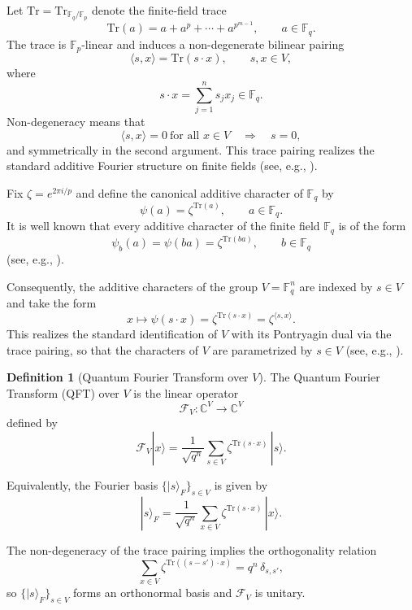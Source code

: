 \documentclass[a4paper,twocolumn,11pt,allowtoday]{quantumarticle}
\theoremstyle{plain}
\theoremstyle{definition}
\newtheorem{definition}[theorem]{Definition}
\theoremstyle{remark}
\begin{document}
Let $\mathrm{Tr}=\mathrm{Tr}_{\mathbb{F}_q/\mathbb{F}_p}$ denote the finite-field trace
\[
\mathrm{Tr}(a)=a+a^p+\cdots+a^{p^{m-1}},
\qquad a\in\mathbb{F}_q.
\]
The trace is $\mathbb{F}_p$-linear and induces a non-degenerate bilinear pairing
\[
\langle s,x\rangle
=
\mathrm{Tr}(s\cdot x),
\qquad s,x\in V,
\]
where
\[
s\cdot x=\sum_{j=1}^n s_j x_j \in \mathbb{F}_q.
\]
Non-degeneracy means that
\[
\langle s,x\rangle=0 \ \text{for all } x\in V
\quad\Longrightarrow\quad
s=0,
\]
and symmetrically in the second argument. 
This trace pairing realizes the standard additive Fourier structure on finite fields (see, e.g., \cite{MacWilliamsSloane}).

Fix $\zeta=e^{2\pi i/p}$ and define the canonical additive character
of $\mathbb{F}_q$ by
\[
\psi(a)=\zeta^{\mathrm{Tr}(a)},
\qquad a\in\mathbb{F}_q .
\]
It is well known that every additive character of the finite field
$\mathbb{F}_q$ is of the form
\[
\psi_b(a)=\psi(ba)=\zeta^{\mathrm{Tr}(ba)},
\qquad b\in\mathbb{F}_q
\]
(see, e.g., \cite{LidlNiederreiter}).

Consequently, the additive characters of the group
$V=\mathbb{F}_q^n$ are indexed by $s\in V$ and take the form
\[
x\longmapsto\psi(s\cdot x)
=
\zeta^{\mathrm{Tr}(s\cdot x)}
=
\zeta^{\langle s,x\rangle}.
\]
This realizes the standard identification of $V$ with its Pontryagin
dual via the trace pairing, so that the characters of $V$ are
parametrized by $s\in V$ (see, e.g., \cite{TaoVu}).


\begin{definition}[Quantum Fourier Transform over $V$]
The Quantum Fourier Transform (QFT) over $V$ is the linear operator
\[
\mathcal{F}_V:\mathbb{C}^{V}\to\mathbb{C}^{V}
\]
defined by
\begin{equation}
\label{eq:QFT_V}
\mathcal{F}_V |x\rangle
=
\frac{1}{\sqrt{q^n}}
\sum_{s\in V}
\zeta^{\mathrm{Tr}(s\cdot x)}\,|s\rangle.
\end{equation}
\end{definition}

Equivalently, the Fourier basis $\{|s\rangle_F\}_{s\in V}$ is given by
\begin{equation}
\label{eq:Fourier_basis}
|s\rangle_F
=
\frac{1}{\sqrt{q^n}}
\sum_{x\in V}
\zeta^{\mathrm{Tr}(s\cdot x)}\,|x\rangle.
\end{equation}

The non-degeneracy of the trace pairing implies the orthogonality relation
\[
\sum_{x\in V}
\zeta^{\mathrm{Tr}((s-s')\cdot x)}
=
q^n\,\delta_{s,s'},
\]
so $\{|s\rangle_F\}_{s\in V}$ forms an orthonormal basis and $\mathcal{F}_V$ is unitary.
\end{document}
